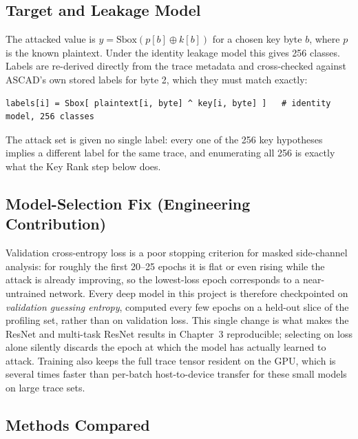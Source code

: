 \subsection{Target and Leakage Model}

The attacked value is $y=\mathrm{Sbox}(p[b]\oplus k[b])$ for a chosen key byte $b$,
where $p$ is the known plaintext. Under the identity leakage model this gives 256
classes. Labels are re-derived directly from the trace metadata and cross-checked
against ASCAD's own stored labels for byte 2, which they must match exactly:

\begin{verbatim}
labels[i] = Sbox[ plaintext[i, byte] ^ key[i, byte] ]   # identity model, 256 classes
\end{verbatim}

The attack set is given no single label: every one of the 256 key hypotheses implies
a different label for the same trace, and enumerating all 256 is exactly what the Key
Rank step below does.

\subsection{Model-Selection Fix (Engineering Contribution)}

Validation cross-entropy loss is a poor stopping criterion for masked side-channel
analysis: for roughly the first 20--25 epochs it is flat or even rising while the
attack is already improving, so the lowest-loss epoch corresponds to a
near-untrained network. Every deep model in this project is therefore checkpointed on
\emph{validation guessing entropy}, computed every few epochs on a held-out slice of
the profiling set, rather than on validation loss. This single change is what makes
the ResNet and multi-task ResNet results in Chapter~3 reproducible; selecting on loss
alone silently discards the epoch at which the model has actually learned to attack.
Training also keeps the full trace tensor resident on the GPU, which is several times
faster than per-batch host-to-device transfer for these small models on large trace
sets.

\subsection{Methods Compared}

